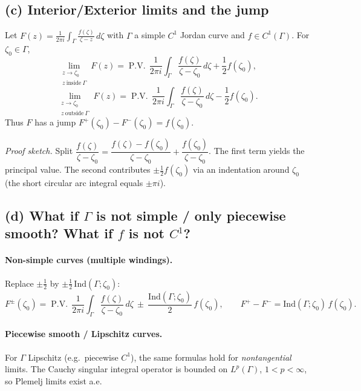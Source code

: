 \documentclass[11pt]{article}
\begin{document}
	\subsection*{(c) Interior/Exterior limits and the jump}
	
	Let $F(z)=\frac{1}{2\pi i}\int_{\Gamma}\frac{f(\zeta)}{\zeta-z}\,d\zeta$ with $\Gamma$ a simple $C^{1}$ Jordan curve and $f\in C^{1}(\Gamma)$. For $\zeta_{0}\in\Gamma$,
	\[
	\lim_{\substack{z\to\zeta_{0}\\ z\ \mathrm{inside}\ \Gamma}} F(z)
	=\operatorname{P.V.}\,\frac{1}{2\pi i}\int_{\Gamma}\frac{f(\zeta)}{\zeta-\zeta_{0}}\,d\zeta
	+\frac{1}{2}f(\zeta_{0}),
	\]
	\[
	\lim_{\substack{z\to\zeta_{0}\\ z\ \mathrm{outside}\ \Gamma}} F(z)
	=\operatorname{P.V.}\,\frac{1}{2\pi i}\int_{\Gamma}\frac{f(\zeta)}{\zeta-\zeta_{0}}\,d\zeta
	-\frac{1}{2}f(\zeta_{0}).
	\]
	Thus $F$ has a jump $F^{+}(\zeta_{0})-F^{-}(\zeta_{0})=f(\zeta_{0})$.
	
	\medskip
	\emph{Proof sketch.}
	Split $\dfrac{f(\zeta)}{\zeta-\zeta_{0}}
	=\dfrac{f(\zeta)-f(\zeta_{0})}{\zeta-\zeta_{0}}
	+\dfrac{f(\zeta_{0})}{\zeta-\zeta_{0}}$.
	The first term yields the principal value. The second contributes $\pm \tfrac12 f(\zeta_{0})$
	via an indentation around $\zeta_{0}$ (the short circular arc integral equals $\pm \pi i$).
	
	\bigskip
	
	\subsection*{(d) What if $\Gamma$ is not simple / only piecewise smooth? What if $f$ is not $C^{1}$?}
	
	\paragraph{Non-simple curves (multiple windings).}
	Replace $\pm\tfrac12$ by $\pm \tfrac12\,\mathrm{Ind}(\Gamma;\zeta_{0})$:
	\[
	F^{\pm}(\zeta_{0})
	=\operatorname{P.V.}\,\frac{1}{2\pi i}\int_{\Gamma}\frac{f(\zeta)}{\zeta-\zeta_{0}}\,d\zeta
	\ \pm\ \frac{\mathrm{Ind}(\Gamma;\zeta_{0})}{2}\,f(\zeta_{0}),
	\qquad
	F^{+}-F^{-}=\mathrm{Ind}(\Gamma;\zeta_{0})\,f(\zeta_{0}).
	\]
	
	\paragraph{Piecewise smooth / Lipschitz curves.}
	For $\Gamma$ Lipschitz (e.g.\ piecewise $C^{1}$), the same formulas hold for \emph{nontangential} limits. The Cauchy singular integral operator is bounded on $L^{p}(\Gamma)$, $1<p<\infty$, so Plemelj limits exist a.e.
	
\end{document}
